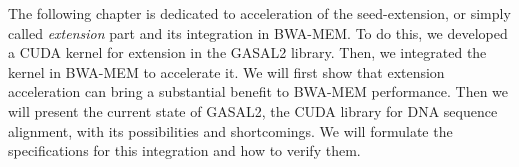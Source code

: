 The following chapter is dedicated to acceleration of the seed-extension, or simply called \emph{extension} part and its integration in BWA-MEM. To do this, we developed a CUDA kernel for extension in the GASAL2 library. Then, we integrated the kernel in BWA-MEM to accelerate it.
We will first show that extension acceleration can bring a substantial benefit to BWA-MEM performance. Then we will present the current state of GASAL2, the CUDA library for DNA sequence alignment, with its possibilities and shortcomings. We will formulate the specifications for this integration and how to verify them.